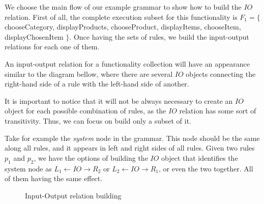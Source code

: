   We choose the main flow of our example grammar to show how to build the $IO$ relation. First of all, the complete execution subset for this functionality is $F_1 = \{$ chooseCategory, displayProducts, chooseProduct, displayItems, chooseItem, displayChosenItem $\}$. Once having the sets of rules, we build the input-output relations for each one of them.

\begin{example}\label{ex:inout}  An input-output relation for a functionality collection will have an appearance similar to the diagram bellow, where there are several $IO$ objects connecting the right-hand side of a rule with the left-hand side of another.


\hfill\break

  It is important to notice that it will not be always necessary to create an $IO$ object for each possible combination of rules, as the $IO$ relation has some sort of transitivity. Thus, we can focus on build only a subset of it.

  Take for example the \emph{system} node in the grammar. This node should be the same along all rules, and it appears in left and right sides of all rules. Given two rules $p_1$ and $p_2$, we have the options of building the $IO$ object that identifies the system node as $L_1 \leftarrow IO \rightarrow R_2$ or $L_2 \leftarrow IO \rightarrow R_1$, or even the two together. All of them having the same effect.

\begin{figure}[!ht]
  \centering
  \caption{Input-Output relation building}\label{fig:tests:inout}
\end{figure}

\end{example}


